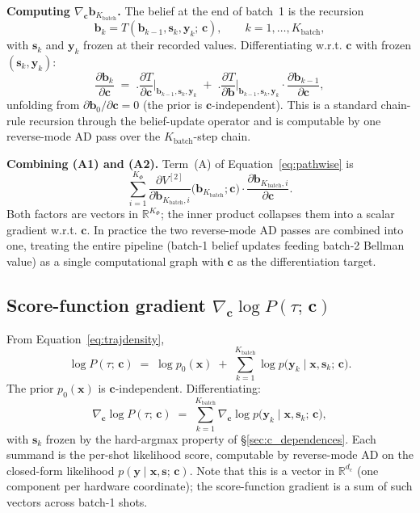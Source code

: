 \documentclass[11pt,a4paper]{article}
\newcommand{\bc}{\bm{c}}
\newcommand{\bx}{\bm{x}}
\newcommand{\by}{\bm{y}}
\newcommand{\bs}{\bm{s}}
\newcommand{\bb}{\bm{b}}
\newcommand{\R}{\mathbb{R}}
\begin{document}
\textbf{Computing $\nabla_{\bc} \bb_{K_\mathrm{batch}}$.}  The belief at the end of batch~1
is the recursion
\[
\bb_k = T(\bb_{k-1}, \bs_k, \by_k;\, \bc), \qquad k = 1, \ldots, K_\mathrm{batch},
\]
with $\bs_k$ and $\by_k$ frozen at their recorded values.  Differentiating w.r.t. $\bc$
with frozen $(\bs_k, \by_k)$:
\begin{equation}
\frac{\partial \bb_k}{\partial \bc}
\;=\;
\biggl.\frac{\partial T}{\partial \bc}\biggr|_{\bb_{k-1}, \bs_k, \by_k}
\;+\;
\biggl.\frac{\partial T}{\partial \bb}\biggr|_{\bb_{k-1}, \bs_k, \by_k}
\cdot
\frac{\partial \bb_{k-1}}{\partial \bc},
\label{eq:belief_chain}
\end{equation}
unfolding from $\partial \bb_0 / \partial \bc = 0$ (the prior is $\bc$-independent).
This is a standard chain-rule recursion through the belief-update operator and is
computable by one reverse-mode AD pass over the $K_\mathrm{batch}$-step chain.

\textbf{Combining (A1) and (A2).}  Term~(A) of Equation~\eqref{eq:pathwise} is
\[
\sum_{i=1}^{K_\Phi} \frac{\partial V^{[2]}}{\partial \bb_{K_\mathrm{batch}, i}}\bigl(\bb_{K_\mathrm{batch}}; \bc\bigr) \cdot \frac{\partial \bb_{K_\mathrm{batch}, i}}{\partial \bc}.
\]
Both factors are vectors in $\R^{K_\Phi}$; the inner product collapses them into a scalar
gradient w.r.t. $\bc$.  In practice the two reverse-mode AD passes are combined into one,
treating the entire pipeline (batch-1 belief updates feeding batch-2 Bellman value) as a
single computational graph with $\bc$ as the differentiation target.

\subsection{Score-function gradient \texorpdfstring{$\nabla_{\bc} \log P(\tau;\, \bc)$}{nabla\_c log P}}
\label{sec:score_function}

From Equation~\eqref{eq:trajdensity},
\[
\log P(\tau;\, \bc)
\;=\;
\log p_0(\bx)
\;+\;
\sum_{k=1}^{K_\mathrm{batch}} \log p\bigl(\by_k \mid \bx, \bs_k;\, \bc\bigr).
\]
The prior $p_0(\bx)$ is $\bc$-independent.  Differentiating:
\begin{equation}
\nabla_{\bc} \log P(\tau;\, \bc)
\;=\;
\sum_{k=1}^{K_\mathrm{batch}} \nabla_{\bc} \log p\bigl(\by_k \mid \bx, \bs_k;\, \bc\bigr),
\label{eq:scorefn}
\end{equation}
with $\bs_k$ frozen by the hard-argmax property of \S\ref{sec:c_dependences}.  Each summand
is the per-shot likelihood score, computable by reverse-mode AD on the closed-form
likelihood $p(\by \mid \bx, \bs;\, \bc)$.  Note that this is a vector in $\R^{d_c}$ (one
component per hardware coordinate); the score-function gradient is a sum of such vectors
across batch-1 shots.
\end{document}
